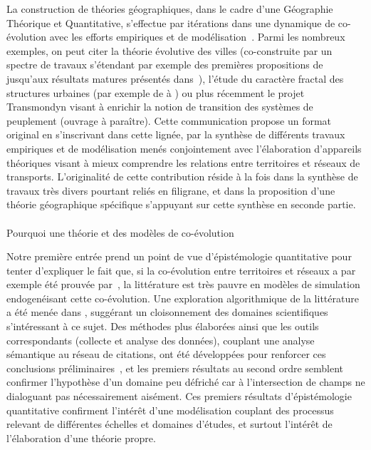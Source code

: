 La construction de théories géographiques, dans le cadre d'une Géographie Théorique et Quantitative, s'effectue par itérations dans une dynamique de co-évolution avec les efforts empiriques et de modélisation~\cite{livet2010}. Parmi les nombreux exemples, on peut citer la théorie évolutive des villes (co-construite par un spectre de travaux s'étendant par exemple des premières propositions de \cite{pumain1997pour} jusqu'aux résultats matures présentés dans~\cite{pumain2012multi}), l'étude du caractère fractal des structures urbaines (par exemple de \cite{frankhauser1998fractal} à \cite{frankhauser2008fractal}) ou plus récemment le projet Transmondyn visant à enrichir la notion de transition des systèmes de peuplement (ouvrage à paraître). Cette communication propose un format original en s'inscrivant dans cette lignée, par la synthèse de différents travaux empiriques et de modélisation menés conjointement avec l'élaboration d'appareils théoriques visant à mieux comprendre les relations entre territoires et réseaux de transports. L'originalité de cette contribution réside à la fois dans la synthèse de travaux très divers pourtant reliés en filigrane, et dans la proposition d'une théorie géographique spécifique s'appuyant sur cette synthèse en seconde partie.



\paragraph{}{Pourquoi une théorie et des modèles de co-évolution}


Notre première entrée prend un point de vue d'épistémologie quantitative pour tenter d'expliquer le fait que, si la co-évolution entre territoires et réseaux a par exemple été prouvée par~\cite{bretagnolle:tel-00459720}, la littérature est très pauvre en modèles de simulation endogenéisant cette co-évolution. Une exploration algorithmique de la littérature a été menée dans \cite{raimbault2015models}, suggérant un cloisonnement des domaines scientifiques s'intéressant à ce sujet. Des méthodes plus élaborées ainsi que les outils correspondants (collecte et analyse des données), couplant une analyse sémantique au réseau de citations, ont été développées pour renforcer ces conclusions préliminaires~\cite{raimbault2016indirect}, et les premiers résultats au second ordre semblent confirmer l'hypothèse d'un domaine peu défriché car à l'intersection de champs ne dialoguant pas nécessairement aisément. Ces premiers résultats d'épistémologie quantitative confirment l'intérêt d'une modélisation couplant des processus relevant de différentes échelles et domaines d'études, et surtout l'intérêt de l'élaboration d'une théorie propre.


